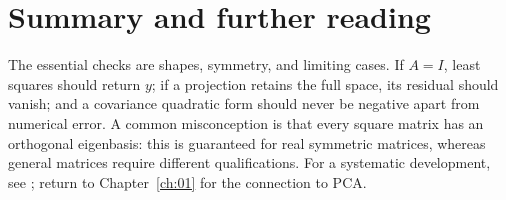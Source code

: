 \section*{Summary and further reading}
The essential checks are shapes, symmetry, and limiting cases. If \(A=I\), least squares should return \(y\); if a projection retains the full space, its residual should vanish; and a covariance quadratic form should never be negative apart from numerical error. A common misconception is that every square matrix has an orthogonal eigenbasis: this is guaranteed for real symmetric matrices, whereas general matrices require different qualifications. For a systematic development, see \citet{ev_axler2024}; return to Chapter~\ref{ch:01} for the connection to PCA.
